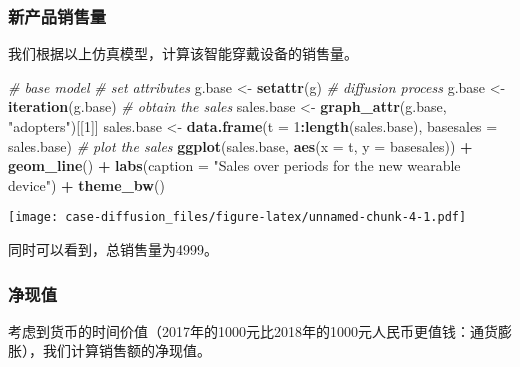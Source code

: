 \documentclass[]{article}
\newenvironment{Shaded}{\begin{snugshade}}{\end{snugshade}}
\newcommand{\CommentTok}[1]{\textcolor[rgb]{0.56,0.35,0.01}{\textit{#1}}}
\newcommand{\DataTypeTok}[1]{\textcolor[rgb]{0.13,0.29,0.53}{#1}}
\newcommand{\DecValTok}[1]{\textcolor[rgb]{0.00,0.00,0.81}{#1}}
\newcommand{\KeywordTok}[1]{\textcolor[rgb]{0.13,0.29,0.53}{\textbf{#1}}}
\newcommand{\NormalTok}[1]{#1}
\newcommand{\OperatorTok}[1]{\textcolor[rgb]{0.81,0.36,0.00}{\textbf{#1}}}
\newcommand{\StringTok}[1]{\textcolor[rgb]{0.31,0.60,0.02}{#1}}
\begin{document}
\subsubsection{新产品销售量}

我们根据以上仿真模型，计算该智能穿戴设备的销售量。

\begin{Shaded}
\begin{Highlighting}[]
\CommentTok{# base model}
\CommentTok{# set attributes}
\NormalTok{g.base <-}\StringTok{ }\KeywordTok{setattr}\NormalTok{(g)}
\CommentTok{# diffusion process}
\NormalTok{g.base <-}\StringTok{ }\KeywordTok{iteration}\NormalTok{(g.base)}
\CommentTok{# obtain the sales}
\NormalTok{sales.base <-}\StringTok{ }\KeywordTok{graph_attr}\NormalTok{(g.base, }\StringTok{"adopters"}\NormalTok{)[[}\DecValTok{1}\NormalTok{]]}
\NormalTok{sales.base <-}\StringTok{ }\KeywordTok{data.frame}\NormalTok{(}\DataTypeTok{t =} \DecValTok{1}\OperatorTok{:}\KeywordTok{length}\NormalTok{(sales.base), }\DataTypeTok{basesales =}\NormalTok{ sales.base)}
\CommentTok{# plot the sales}
\KeywordTok{ggplot}\NormalTok{(sales.base, }\KeywordTok{aes}\NormalTok{(}\DataTypeTok{x =}\NormalTok{ t, }\DataTypeTok{y =}\NormalTok{ basesales)) }\OperatorTok{+}\StringTok{ }\KeywordTok{geom_line}\NormalTok{() }\OperatorTok{+}\StringTok{ }\KeywordTok{labs}\NormalTok{(}\DataTypeTok{caption =} \StringTok{"Sales over periods for the new wearable device"}\NormalTok{) }\OperatorTok{+}\StringTok{ }\KeywordTok{theme_bw}\NormalTok{()}
\end{Highlighting}
\end{Shaded}

\texttt{[image: case-diffusion\_files/figure-latex/unnamed-chunk-4-1.pdf]}

同时可以看到，总销售量为4999。

\subsubsection{净现值}

考虑到货币的时间价值（2017年的1000元比2018年的1000元人民币更值钱：通货膨胀），我们计算销售额的净现值。

\begin{Shaded}
\end{Shaded}
\end{document}
